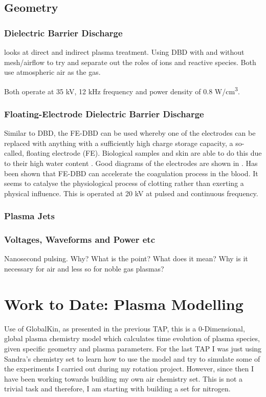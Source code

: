 \documentclass[11pt, oneside]{article}   	%
\begin{document}
\subsection{Geometry}
\subsubsection{Dielectric Barrier Discharge}
\cite{Fridman2007comparison} looks at direct and indirect plasma treatment. Using DBD with and without mesh/airflow to try and separate out the roles of ions and reactive species.
Both use atmospheric air as the gas.

Both operate at 35 kV, 12 kHz frequency and power density of 0.8 W/cm\textsuperscript{3}.


\subsubsection{Floating-Electrode Dielectric Barrier Discharge}
Similar to DBD, the FE-DBD can be used whereby one of the electrodes can be replaced with anything with a sufficiently high charge storage capacity, a so-called, floating electrode (FE). 
Biological samples and skin are able to do this due to their high water content {\cite{Fridman2006blood}}.
Good diagrams of the electrodes are shown in {\cite{Fridman2006blood}}.
Has been shown that FE-DBD can accelerate the coagulation process in the blood. It seems to catalyse the physiological process of clotting rather than exerting a physical influence.
This is operated at 20 kV at pulsed and continuous frequency.



\subsubsection{Plasma Jets}


\subsubsection{Voltages, Waveforms and Power etc}

Nanosecond pulsing.
Why? What is the point? What does it mean? Why is it necessary for air and less so for noble gas plasmas?


\section{Work to Date: Plasma Modelling}
Use of GlobalKin, as presented in the previous TAP, this is a 0-Dimensional, global plasma chemistry model which calculates time evolution of plasma species, given specific geometry and plasma parameters.
For the last TAP I was just using Sandra's chemistry set to learn how to use the model and try to simulate some of the experiments I carried out during my rotation project.
However, since then I have been working towards building my own air chemistry set.
This is not a trivial task and therefore, I am starting with building a set for nitrogen.
\end{document}
